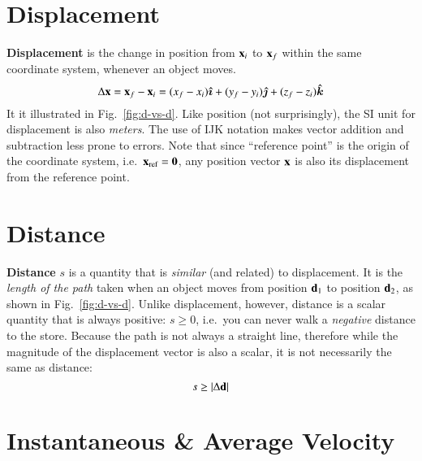 \documentclass{../../oss-handout}
\newcommand{\mb}[1]{\ensuremath\mathbf{#1}}
\begin{document}
\section{Displacement}

\textbf{Displacement} is the change in position from $\mb{x}_i$ to
$\mb{x}_f$ within the same coordinate system, whenever an object moves.
\begin{equation*}
  \Delta\mb{x}=\mb{x}_f-\mb{x}_i
  =(x_f-x_i)\bm{\hat{\imath}}+
  (y_f-y_i)\bm{\hat{\jmath}}+
  (z_f-z_i)\bm{\hat{k}}
\end{equation*}
It it illustrated in Fig.~\ref{fig:d-vs-d}. Like position (not surprisingly),
the SI unit for displacement is also \emph{meters}. The use of IJK notation
makes vector addition and subtraction less prone to errors. Note that since
``reference point'' is the origin of the coordinate system, i.e.\
$\mb{x}_{\textrm{ref}}=\mb{0}$, any position vector $\mb{x}$ is also its
displacement from the reference point.



\section{Distance}%

\textbf{Distance} $s$ is a quantity that is \emph{similar} (and related) to
displacement. It is the \emph{length of the path} taken when an object moves
from position $\mb{d}_1$ to position $\mb{d}_2$, as shown in
Fig.~\ref{fig:d-vs-d}. Unlike displacement, however, distance is a scalar
quantity that is always positive: $s\geq 0$, i.e.\ you can never walk a
\emph{negative} distance to the store. Because the path is not always a
straight line, therefore while the magnitude of the displacement vector is also
a scalar, it is not necessarily the same as distance:
\begin{equation*}
  s\geq |\Delta\mb{d}|
\end{equation*}


\section{Instantaneous \& Average Velocity}
\end{document}
